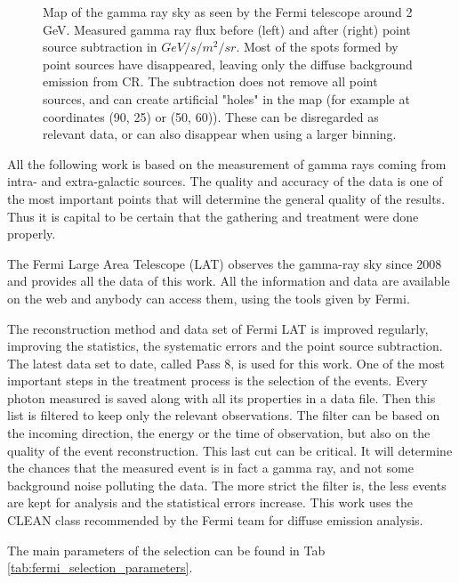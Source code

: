 \begin{figure}[h]
\begin{minipage}[h]{0.45\textwidth}
	  \subcaption{}
	  \label{fig:data_ptsrc_subtracted}
  \end{minipage}
  \caption{Map of the gamma ray sky as seen by the Fermi telescope around 2 GeV. Measured gamma ray flux before (left) and after (right) point source subtraction in $GeV/s/m^2/sr$. Most of the spots formed by point sources have disappeared, leaving only the diffuse background emission from CR. The subtraction does not remove all point sources, and can create artificial "holes" in the map (for example at coordinates (90, 25) or (50, 60)). These can be disregarded as relevant data, or can also disappear when using a larger binning.}
  \label{fig:method_pass8} 
\end{figure}

All the following work is based on the measurement of gamma rays coming from intra- and extra-galactic sources. The quality and accuracy of the data is one of the most important points that will determine the general quality of the results. Thus it is capital to be certain that the gathering and treatment were done properly.

The Fermi Large Area Telescope (LAT) observes the gamma-ray sky since 2008 and provides all the data of this work. \cite{Fermi2009}
All the information and data are available on the web and anybody can access them, using the tools given by Fermi. \cite{FermiTools}

The reconstruction method and data set of Fermi LAT is improved regularly, improving the statistics, the systematic errors and the point source subtraction. The latest data set to date, called Pass 8, is used for this work.
One of the most important steps in the treatment process is the selection of the events. Every photon measured is saved along with all its properties in a data file. Then this list is filtered to keep only the relevant observations. The filter can be based on the incoming direction, the energy or the time of observation, but also on the quality of the event reconstruction. This last cut can be critical. It will determine the chances that the measured event is in fact a gamma ray, and not some background noise polluting the data. The more strict the filter is, the less events are kept for analysis and the statistical errors increase. This work uses the CLEAN class recommended by the Fermi team for diffuse emission analysis. \cite{FermiTools}

The main parameters of the selection can be found in Tab \ref{tab:fermi_selection_parameters}.

